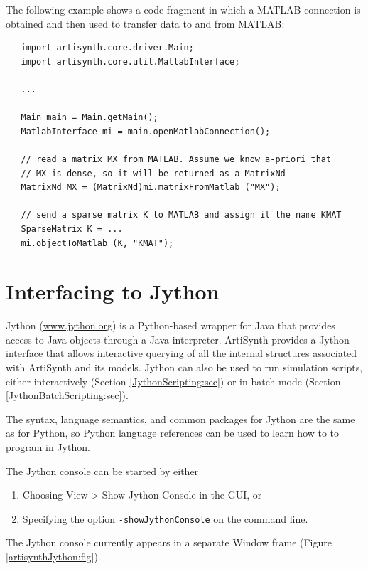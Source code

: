 \documentclass{article}
\begin{document}
The following example shows a code fragment in which a MATLAB
connection is obtained and then used to transfer data to and from
MATLAB:

\begin{lstlisting}
   import artisynth.core.driver.Main;
   import artisynth.core.util.MatlabInterface;

   ...

   Main main = Main.getMain();
   MatlabInterface mi = main.openMatlabConnection();

   // read a matrix MX from MATLAB. Assume we know a-priori that
   // MX is dense, so it will be returned as a MatrixNd
   MatrixNd MX = (MatrixNd)mi.matrixFromMatlab ("MX");

   // send a sparse matrix K to MATLAB and assign it the name KMAT
   SparseMatrix K = ...
   mi.objectToMatlab (K, "KMAT");
\end{lstlisting}

\section{Interfacing to Jython}
\label{JythonInterface:sec}

Jython (\href{http://www.jython.org}{www.jython.org})
is a Python-based wrapper for
Java that provides access to Java objects through a Java interpreter.
ArtiSynth provides a Jython interface that allows interactive querying
of all the internal structures associated with ArtiSynth and its
models. Jython can also be used to run simulation scripts, either
interactively (Section \ref{JythonScripting:sec}) or in batch mode
(Section \ref{JythonBatchScripting:sec}).

The syntax, language semantics, and common packages for Jython are
the same as for Python, so Python language references can be used to
learn how to to program in Jython.

The Jython console can be started by either

\begin{enumerate}

\item Choosing {\sf View > Show Jython Console} in the GUI, or

\item Specifying the option {\tt -showJythonConsole} on
the command line.

\end{enumerate}

The Jython console currently appears in a separate Window frame
(Figure \ref{artisynthJython:fig}).
\end{document}
